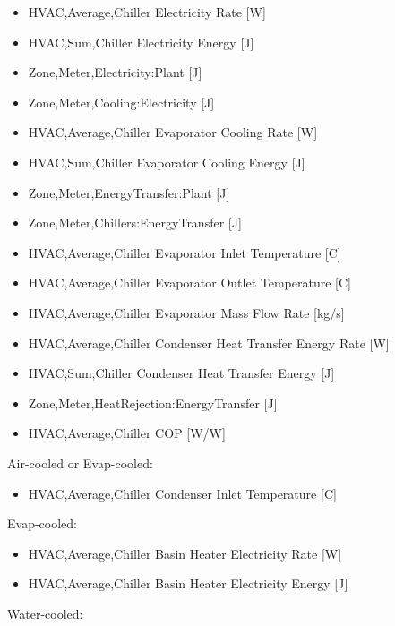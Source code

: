 \begin{itemize}
    \item
    HVAC,Average,Chiller Electricity Rate {[}W{]}
    \item
    HVAC,Sum,Chiller Electricity Energy {[}J{]}
    \item
    Zone,Meter,Electricity:Plant {[}J{]}
    \item
    Zone,Meter,Cooling:Electricity {[}J{]}
    \item
    HVAC,Average,Chiller Evaporator Cooling Rate {[}W{]}
    \item
    HVAC,Sum,Chiller Evaporator Cooling Energy {[}J{]}
    \item
    Zone,Meter,EnergyTransfer:Plant {[}J{]}
    \item
    Zone,Meter,Chillers:EnergyTransfer {[}J{]}
    \item
    HVAC,Average,Chiller Evaporator Inlet Temperature {[}C{]}
    \item
    HVAC,Average,Chiller Evaporator Outlet Temperature {[}C{]}
    \item
    HVAC,Average,Chiller Evaporator Mass Flow Rate {[}kg/s{]}
    \item
    HVAC,Average,Chiller Condenser Heat Transfer Energy Rate {[}W{]}
    \item
    HVAC,Sum,Chiller Condenser Heat Transfer Energy {[}J{]}
    \item
    Zone,Meter,HeatRejection:EnergyTransfer {[}J{]}
    \item
    HVAC,Average,Chiller COP {[}W/W{]}
\end{itemize}

Air-cooled or Evap-cooled:

\begin{itemize}
    \tightlist
    \item
    HVAC,Average,Chiller Condenser Inlet Temperature {[}C{]}
\end{itemize}

Evap-cooled:

\begin{itemize}
    \item
    HVAC,Average,Chiller Basin Heater Electricity Rate {[}W{]}
    \item
    HVAC,Average,Chiller Basin Heater Electricity Energy {[}J{]}
\end{itemize}

Water-cooled:

